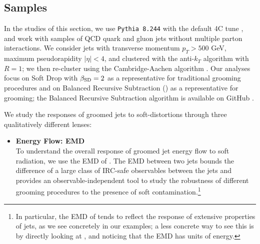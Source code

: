 \begin{subappendices}

\section{Samples}
In the studies of this section, we use \texttt{Pythia 8.244} \cite{Sjostrand:2014zea} with the default 4C tune \cite{Corke:2010yf}, and work with samples of QCD quark and gluon jets without multiple parton interactions.
%
We consider jets with transverse momentum \(p_T > 500\) GeV, maximum pseudorapidity \(|\eta| < 4\), and clustered with the anti-\(k_T\) algorithm \cite{Cacciari:2008gp} with \(R = 1\);
%
we then re-cluster using the Cambridge-Aachen algorithm \cite{Dokshitzer:1997in,Wobisch:1998wt}.
%
Our analyses focus on Soft Drop with \(\beta_{\rm SD} = 2\) as a representative for traditional grooming procedures and on Balanced Recursive Subtraction () as a representative for \PIRANHA{} grooming;
%
the Balanced Recursive Subtraction algorithm is available on GitHub \cite{piranhagithub}.

We study the responses of groomed jets to \glspl{soft-distortion} through three qualitatively different lenses:
\begin{itemize}
    \item \textbf{Energy Flow: EMD}
    \\
    To understand the overall response of groomed jet energy flow to soft radiation, we use the EMD of .
    The EMD between two jets bounds the difference of a large class of IRC-safe observables between the jets and provides an observable-independent tool to study the robustness of different grooming procedures to the presence of soft contamination.\footnote{
    In particular, the EMD of  tends to reflect the response of extensive properties of jets, as we see concretely in our examples;
    a less concrete way to see this is by directly looking at , and noticing that the EMD has units of energy.
    }


\end{itemize}
\end{subappendices}
